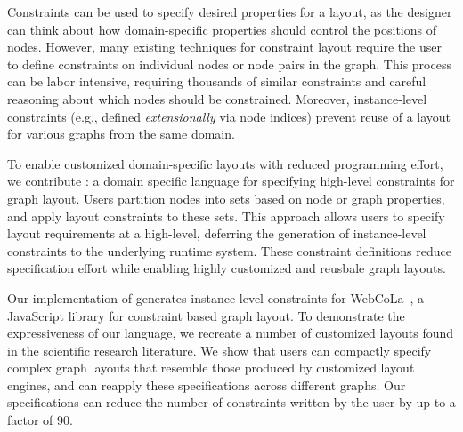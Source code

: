 Constraints can be used to specify desired properties for a layout, as the designer can think about how domain-specific properties should control the positions of nodes. However, many existing techniques
for constraint layout require the user to define constraints
on individual nodes or node pairs in the graph. This process can be labor
intensive, requiring thousands of similar constraints and careful reasoning
about which nodes should be constrained. Moreover, instance-level constraints (e.g., defined \emph{extensionally} via node indices) prevent
reuse of a layout for various graphs from the same domain.

To enable customized domain-specific layouts with reduced
programming effort, we contribute \projectname: a domain specific language for
specifying high-level constraints for graph layout. Users partition nodes
into sets based on node or graph properties, and apply layout constraints
to these sets. This approach allows users to specify layout
requirements at a high-level, deferring the generation of
instance-level constraints to the underlying runtime system. These constraint
definitions reduce specification effort while enabling highly
customized and reusbale graph layouts.

Our implementation of \projectname generates instance-level constraints for
WebCoLa~\cite{WebCoLa}, a JavaScript library for constraint based graph
layout. To demonstrate the expressiveness of our language, we
recreate a number of customized layouts found in the scientific research 
literature. We
show that users can compactly specify complex graph layouts that resemble
those produced by customized layout engines, and can reapply these
specifications across different graphs. Our \projectname specifications
can reduce the number of constraints written by the user by up to a 
factor of 90.
